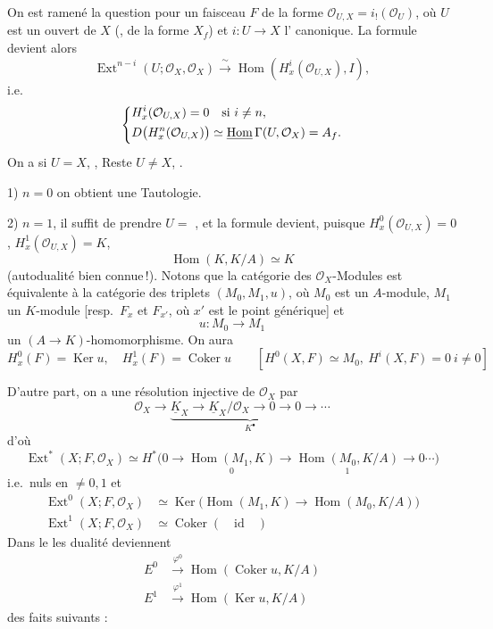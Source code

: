 \documentclass[11pt,a4paper]{article}
\begin{document}
On est ramené  la question pour un faisceau $F$ de la forme
$\mathcal{O}_{U,X} = i_!(\mathcal{O}_U)$, où $U$ est un ouvert
de $X$ (, de la forme $X_f$) et $i : U \to X$
l' canonique. La formule devient alors
\[
  \operatorname{Ext}^{n-i}(U; \mathcal{O}_X, \mathcal{O}_X)
  \xrightarrow{\ \sim\ } \operatorname{Hom}(H^i_x(\mathcal{O}_{U,X}), I),
\]
i.e.
\[
\left\{
\begin{aligned}
  &H^i_x(\mathcal{O}_{U,X}) = 0 \quad \text{si } i \neq n,\\
  &D\bigl(H^n_x(\mathcal{O}_{U,X})\bigr) \simeq \struck{\operatorname{Hom}}\,
  \Gamma(U, \mathcal{O}_X) = A_f.
\end{aligned}
\right.
\]
\struck{\ill{}} On a \ill{} si $U = X$, , Reste $U
\neq X$, \ill{}.


1) $n = 0$ on obtient une Tautologie.

2) $n = 1$, il suffit de prendre $U =$  ,
et la formule devient, puisque $H^0_x(\mathcal{O}_{U,X}) = 0$,
$H^1_x(\mathcal{O}_{U,X}) = K$,
\[
  \operatorname{Hom}(K, K/A) \simeq K
\]
(autodualité bien connue\,!). Notons que  la
catégorie des $\mathcal{O}_X$-Modules est équivalente à la
catégorie des triplets $(M_0, M_1, u)$, où $M_0$ est un $A$-module, $M_1$ un
$K$-module [resp.\ $F_x$ et $F_{x'}$, où $x'$ est le point générique] et
\[
  u : M_0 \longrightarrow M_1
\]
un $(A \to K)$-homomorphisme. On aura
\[
  H^0_x(F) = \operatorname{Ker} u, \quad H^1_x(F) = \operatorname{Coker} u
  \qquad [H^0(X, F) \simeq M_0,\ H^i(X, F) = 0 \ i \neq 0]
\]

D'autre part, on a une résolution injective de
$\mathcal{O}_X$ par
\[
  \mathcal{O}_X \longrightarrow \underbrace{\underline{K}_X \longrightarrow
  \underline{K}_X/\mathcal{O}_X \longrightarrow 0 \longrightarrow 0
  \longrightarrow \cdots}_{K^{\bullet}}
\]
d'où
\[
  \operatorname{Ext}^{*}(X; F, \mathcal{O}_X) \simeq H^{*}\bigl(0
  \longrightarrow \underset{0}{\operatorname{Hom}(M_1, K)} \longrightarrow
  \underset{1}{\operatorname{Hom}(M_0, K/A)} \longrightarrow 0 \cdots\bigr)
\]
i.e.\ nuls en  $\neq 0, 1$ et
\[
\begin{aligned}
  \operatorname{Ext}^0(X; F, \mathcal{O}_X) &\simeq
  \operatorname{Ker}\bigl(\operatorname{Hom}(M_1, K) \to
  \operatorname{Hom}(M_0, K/A)\bigr)\\
  \operatorname{Ext}^1(X; F, \mathcal{O}_X) &\simeq
  \operatorname{Coker}(\quad \text{id} \quad)
\end{aligned}
\]
Dans le  \ill{} les  dualité
deviennent
\[
\begin{aligned}
  E^0 &\overset{\varphi^0}{\longrightarrow}
  \operatorname{Hom}(\operatorname{Coker} u, K/A)\\
  E^1 &\overset{\varphi^1}{\longrightarrow}
  \operatorname{Hom}(\operatorname{Ker} u, K/A)
\end{aligned}
\]
  des faits suivants :
\end{document}
